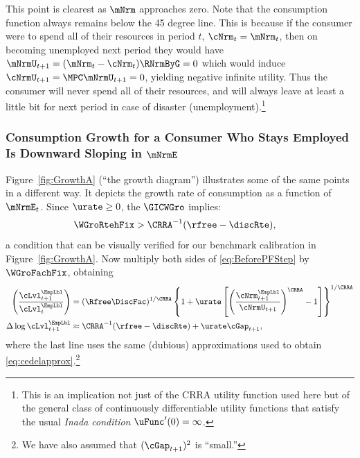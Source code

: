 \documentclass{econark}
\begin{document}
This point is clearest as $\mNrm$ approaches zero.  Note that the
consumption function always remains below the 45 degree line.  This
is because if the consumer were to spend all of their resources in period $t$, $\cNrm_{t}=\mNrm_{t}$, then on becoming unemployed next period they would have $\mNrmU_{t+1}=(\mNrm_{t}-\cNrm_{t})\RNrmByG=0$ which
would induce $\cNrmU_{t+1}= \MPC \mNrmU_{t+1}=0$, yielding negative
infinite utility.  Thus the consumer will never spend all of their resources, and will always leave at least a little bit for next period
in case of disaster (unemployment).\footnote{This is an implication not just
of the CRRA utility function used here but of the general class of continuously differentiable utility
functions that satisfy the usual {\it Inada condition} $\uFunc^{\prime}(0) = \infty$.}

\subsubsection{Consumption Growth for a Consumer Who Stays Employed Is Downward Sloping in $\mNrmE$}
Figure~\ref{fig:GrowthA} (``the growth diagram'') illustrates some of the same points in a different
way.  It depicts the growth rate of consumption as a function of $\mNrmE_{t}$.
Since $\urate \geq 0$, the $\GICWGro$
implies:
\begin{equation}\begin{gathered}\begin{aligned}
  \WGroRtehFix & >  \CRRA^{-1}(\rfree-\discRte) ,
\end{aligned}\end{gathered}\end{equation}
a condition that can be visually verified for our benchmark calibration in Figure~\ref{fig:GrowthA}.  Now multiply both sides of \eqref{eq:BeforePFStep} by $\WGroFachFix$, obtaining
\begin{equation}\begin{gathered}\begin{aligned}
        \left(\frac{\cLvl^{\EmpLbl}_{t+1}}{\cLvl^{\EmpLbl}_{t}}\right) & =  (\Rfree\DiscFac)^{1/\CRRA} \left\{1+\urate\left[\left(\frac{{\cNrm}^{\EmpLbl}_{t+1}}{\cNrmU_{t+1}}\right)^{\CRRA}-1\right]\right\}^{1/\CRRA} \label{eq:cLevGro}
\\       \Delta \log \cLvl^{\EmpLbl}_{t+1} & \approx  \CRRA^{-1}(\rfree-\discRte) +  \urate \cGap _{t+1}, %
\end{aligned}\end{gathered}\end{equation}
where the last line uses the same (dubious) approximations used to obtain
\eqref{eq:cedelapprox}.\footnote{We have also assumed that $(\cGap _{t+1})^{2}$ is ``small.''}
\end{document}
